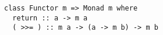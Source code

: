 \begin{algorithm}

\begin{verbatim}
class Functor m => Monad m where
  return :: a -> m a
  ( >>= ) :: m a -> (a -> m b) -> m b
\end{verbatim}

\caption{Monad type class in Haskell %
\label{monad:haskell}}
\end{algorithm}
